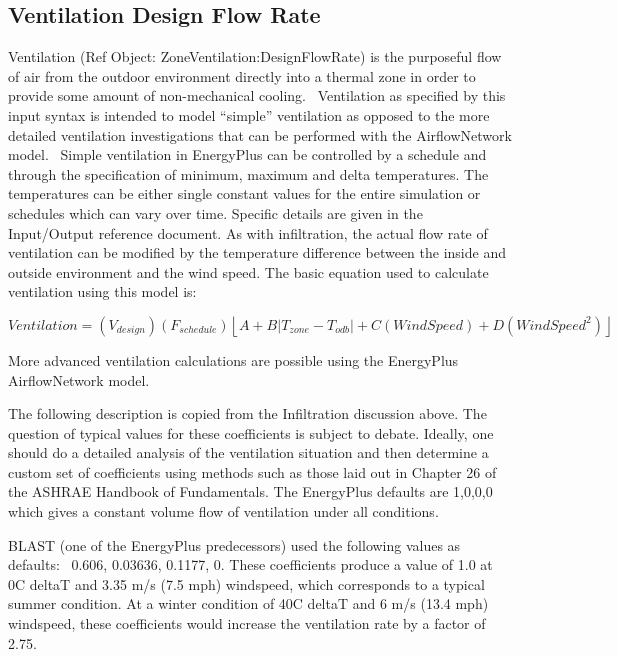\subsection{Ventilation Design Flow Rate}\label{ventilation-design-flow-rate}

Ventilation (Ref Object: ZoneVentilation:DesignFlowRate) is the purposeful flow of air from the outdoor environment directly into a thermal zone in order to provide some amount of non-mechanical cooling.~ Ventilation as specified by this input syntax is intended to model ``simple'' ventilation as opposed to the more detailed ventilation investigations that can be performed with the AirflowNetwork model.~ Simple ventilation in EnergyPlus can be controlled by a schedule and through the specification of minimum, maximum and delta temperatures. The temperatures can be either single constant values for the entire simulation or schedules which can vary over time. Specific details are given in the Input/Output reference document. As with infiltration, the actual flow rate of ventilation can be modified by the temperature difference between the inside and outside environment and the wind speed. The basic equation used to calculate ventilation using this model is:

\begin{equation}
Ventilation = \left( {{V_{design}}} \right)\left( {{F_{schedule}}} \right)\left\lfloor {A + B\left| {{T_{zone}} - {T_{odb}}} \right| + C\left( {WindSpeed} \right) + D\left( {WindSpee{d^2}} \right)} \right\rfloor
\end{equation}

More advanced ventilation calculations are possible using the EnergyPlus AirflowNetwork model.

The following description is copied from the Infiltration discussion above. The question of typical values for these coefficients is subject to debate. Ideally, one should do a detailed analysis of the ventilation situation and then determine a custom set of coefficients using methods such as those laid out in Chapter 26 of the ASHRAE Handbook of Fundamentals. The EnergyPlus defaults are 1,0,0,0 which gives a constant volume flow of ventilation under all conditions.

BLAST (one of the EnergyPlus predecessors) used the following values as defaults:~ 0.606, 0.03636, 0.1177, 0. These coefficients produce a value of 1.0 at 0C deltaT and 3.35 m/s (7.5 mph) windspeed, which corresponds to a typical summer condition. At a winter condition of 40C deltaT and 6 m/s (13.4 mph) windspeed, these coefficients would increase the ventilation rate by a factor of 2.75.

